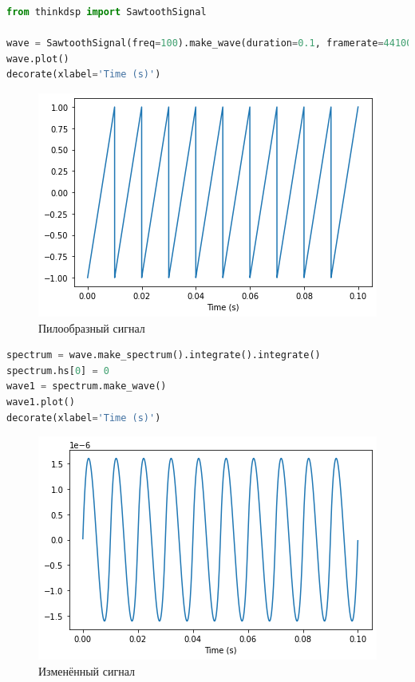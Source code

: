 \begin{lstlisting}[language=Python]
from thinkdsp import SawtoothSignal

wave = SawtoothSignal(freq=100).make_wave(duration=0.1, framerate=44100)
wave.plot()
decorate(xlabel='Time (s)')
\end{lstlisting}
\begin{figure}[H]
	\begin{center}
		\includegraphics[scale=1]{fig/lab09/lab09_7.png}
		\caption{Пилообразный сигнал}
	\end{center}
\end{figure}

\begin{lstlisting}[language=Python]
spectrum = wave.make_spectrum().integrate().integrate()
spectrum.hs[0] = 0
wave1 = spectrum.make_wave()
wave1.plot()
decorate(xlabel='Time (s)')
\end{lstlisting}
\begin{figure}[H]
	\begin{center}
		\includegraphics[scale=1]{fig/lab09/lab09_8.png}
		\caption{Изменённый сигнал}
	\end{center}
\end{figure}

